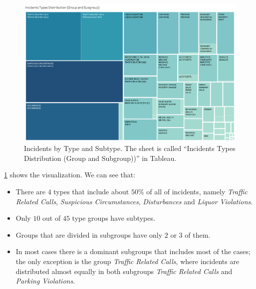 \begin{figure}[h]
	\centering
	\includegraphics[width=\columnwidth]{figures/4_3_groups_subgroups}
	\caption{Incidents by Type and Subtype. The sheet is called ``Incidents Types Distribution (Group and Subgroup))'' in Tableau.}
	\label{fig:4_3_groups_subgroups}
\end{figure}

\cref{fig:4_3_groups_subgroups} shows the visualization.
We can see that:
\begin{itemize}
	\item There are $4$ types that include about $50\%$ of all of incidents, namely \textit{Traffic Related Calls}, \textit{Suspicious Circumstances}, \textit{Disturbances} and \textit{Liquor Violations}.
	\item Only $10$ out of $45$ type groups have subtypes.
	\item Groups that are divided in subgroups have only $2$ or $3$ of them.
	\item In most cases there is a dominant subgroups that includes most of the cases; the only exception is the group \textit{Traffic Related Calls}, where incidents are distributed almost equally in both subgroups \textit{Traffic Related Calls} and \textit{Parking Violations}.
\end{itemize}

